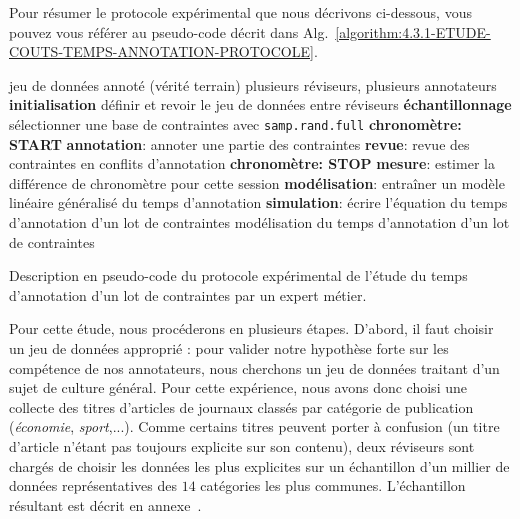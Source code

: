 			Pour résumer le protocole expérimental que nous décrivons ci-dessous, vous pouvez vous référer au pseudo-code décrit dans Alg.~\ref{algorithm:4.3.1-ETUDE-COUTS-TEMPS-ANNOTATION-PROTOCOLE}.
			\begin{algorithm}[!htb]
				\begin{algorithmic}[1]
					\Require jeu de données annoté (vérité terrain)
					\Require plusieurs réviseurs, plusieurs annotateurs
					\State \textbf{initialisation} définir et revoir le jeu de données entre réviseurs
					\State \textbf{échantillonnage} sélectionner une base de contraintes avec \texttt{samp.rand.full}
							\State \textbf{chronomètre: START}
							\State \textbf{annotation}: annoter une partie des contraintes
							\State \textbf{revue}: revue des contraintes en conflits d'annotation
							\State \textbf{chronomètre: STOP}
							\State \textbf{mesure}: estimer la différence de chronomètre pour cette session
						\EndWhile
					\EndFor
					\State \textbf{modélisation}: entraîner un modèle linéaire généralisé du temps d'annotation
					\State \textbf{simulation}: écrire l'équation du temps d'annotation d'un lot de contraintes
					\Ensure modélisation du temps d'annotation d'un lot de contraintes
				\end{algorithmic}
				\caption{Description en pseudo-code du protocole expérimental de l'étude du temps d'annotation d'un lot de contraintes par un expert métier.}
				\label{algorithm:4.3.1-ETUDE-COUTS-TEMPS-ANNOTATION-PROTOCOLE}
			\end{algorithm}
			
			Pour cette étude, nous procéderons en plusieurs étapes.
			D'abord, il faut choisir un jeu de données approprié : pour valider notre hypothèse forte sur les compétence de nos annotateurs, nous cherchons un jeu de données traitant d'un sujet de culture général.
			Pour cette expérience, nous avons donc choisi une collecte des titres d'articles de journaux classés par catégorie de publication (\textit{économie}, \textit{sport},...).
			Comme certains titres peuvent porter à confusion (un titre d'article n'étant pas toujours explicite sur son contenu), deux réviseurs sont chargés de choisir les données les plus explicites sur un échantillon d'un millier de données représentatives des $14$ catégories les plus communes.
			L'échantillon résultant est décrit en annexe~.
			
